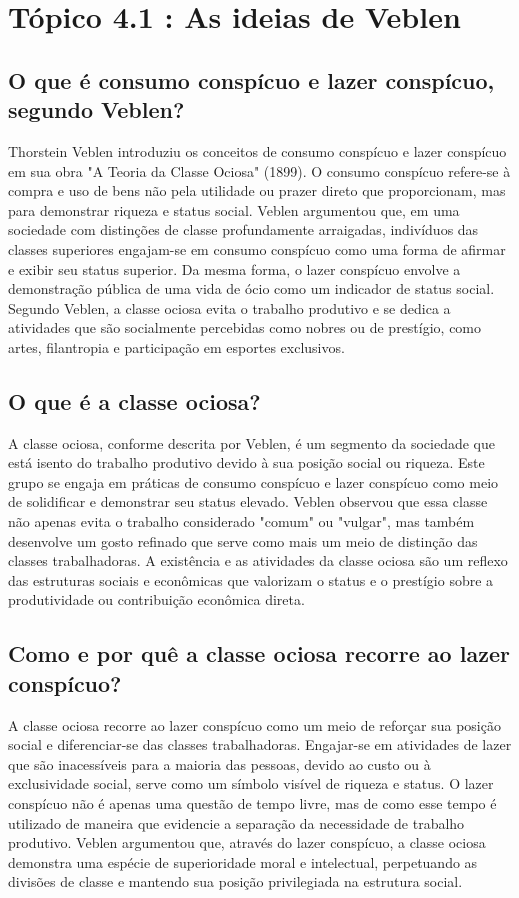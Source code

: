\documentclass[12pt]{article}
\begin{document}
\section{\textbf{Tópico 4.1 : As ideias de Veblen}}
\subsection{\textbf{O que é consumo conspícuo e lazer conspícuo, segundo Veblen?}}
Thorstein Veblen introduziu os conceitos de consumo conspícuo e lazer conspícuo em sua obra "A Teoria da Classe Ociosa" (1899). O consumo conspícuo refere-se à compra e uso de bens não pela utilidade ou prazer direto que proporcionam, mas para demonstrar riqueza e status social. Veblen argumentou que, em uma sociedade com distinções de classe profundamente arraigadas, indivíduos das classes superiores engajam-se em consumo conspícuo como uma forma de afirmar e exibir seu status superior. Da mesma forma, o lazer conspícuo envolve a demonstração pública de uma vida de ócio como um indicador de status social. Segundo Veblen, a classe ociosa evita o trabalho produtivo e se dedica a atividades que são socialmente percebidas como nobres ou de prestígio, como artes, filantropia e participação em esportes exclusivos.
\subsection{\textbf{O que é a classe ociosa?}}
A classe ociosa, conforme descrita por Veblen, é um segmento da sociedade que está isento do trabalho produtivo devido à sua posição social ou riqueza. Este grupo se engaja em práticas de consumo conspícuo e lazer conspícuo como meio de solidificar e demonstrar seu status elevado. Veblen observou que essa classe não apenas evita o trabalho considerado "comum" ou "vulgar", mas também desenvolve um gosto refinado que serve como mais um meio de distinção das classes trabalhadoras. A existência e as atividades da classe ociosa são um reflexo das estruturas sociais e econômicas que valorizam o status e o prestígio sobre a produtividade ou contribuição econômica direta.
\subsection{\textbf{Como e por quê a classe ociosa recorre ao lazer conspícuo?}}
A classe ociosa recorre ao lazer conspícuo como um meio de reforçar sua posição social e diferenciar-se das classes trabalhadoras. Engajar-se em atividades de lazer que são inacessíveis para a maioria das pessoas, devido ao custo ou à exclusividade social, serve como um símbolo visível de riqueza e status. O lazer conspícuo não é apenas uma questão de tempo livre, mas de como esse tempo é utilizado de maneira que evidencie a separação da necessidade de trabalho produtivo. Veblen argumentou que, através do lazer conspícuo, a classe ociosa demonstra uma espécie de superioridade moral e intelectual, perpetuando as divisões de classe e mantendo sua posição privilegiada na estrutura social.
\end{document}
